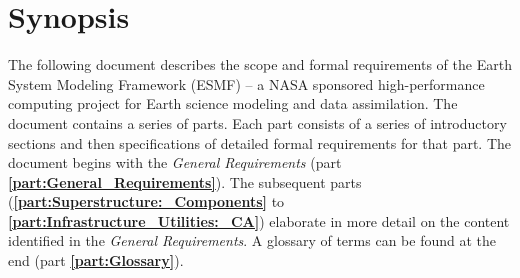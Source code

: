\section{Synopsis}

The following document describes the scope and formal requirements
of the Earth System Modeling Framework (ESMF) -- a NASA sponsored 
high-performance computing project for Earth science modeling and 
data assimilation. The document contains a series of parts.
Each part consists of a series of introductory
sections and then specifications of detailed formal requirements
for that part. The document begins with the {\it General Requirements}
(part {\bf \ref{part:General_Requirements}}). The subsequent parts 
({\bf \ref{part:Superstructure:_Components}} to {\bf \ref{part:Infrastructure_Utilities:_CA}}) elaborate in more detail on the content identified in
the {\it General Requirements}.
A glossary of terms can be found at the end (part {\bf \ref{part:Glossary}}).








